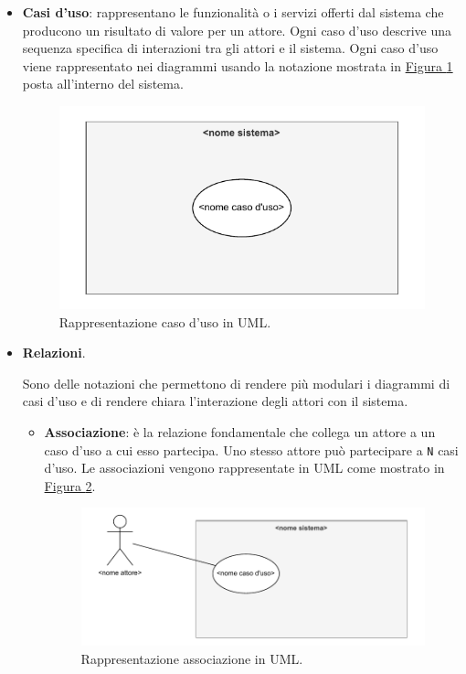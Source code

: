 \begin{itemize}
    \item \textbf{Casi d'uso}: rappresentano le funzionalità o i servizi offerti dal sistema che producono un risultato di valore per un attore. Ogni caso d'uso descrive una sequenza specifica di interazioni tra gli attori e il sistema.
    Ogni caso d'uso viene rappresentato nei diagrammi usando la notazione mostrata in \hyperref[fig:caso_uso]{Figura \ref{fig:caso_uso}} posta all'interno del sistema.
    \begin{figure}[!h]
        \centering
        \includegraphics{Sezioni/ProcessiPrimari/Immagini/caso_uso.pdf}
        \caption{Rappresentazione caso d'uso in UML.}
        \label{fig:caso_uso}
    \end{figure}
    
    \item \textbf{Relazioni}.
    
    Sono delle notazioni che permettono di rendere più modulari i diagrammi di casi d'uso e di rendere chiara l'interazione degli attori con il sistema.
    
    \begin{itemize}
        \item \textbf{Associazione}: è la relazione fondamentale che collega un attore a un caso d'uso a cui esso partecipa.
        Uno stesso attore può partecipare a \texttt{N} casi d'uso.
        Le associazioni vengono rappresentate in UML come mostrato in \hyperref[fig:associazione_uml]{Figura \ref{fig:associazione_uml}}.
        \begin{figure}[!h]
            \centering
            \includegraphics{Sezioni/ProcessiPrimari/Immagini/associazione_uml.pdf}
            \caption{Rappresentazione associazione in UML.}
            \label{fig:associazione_uml}
        \end{figure}


\end{itemize}
\end{itemize}
